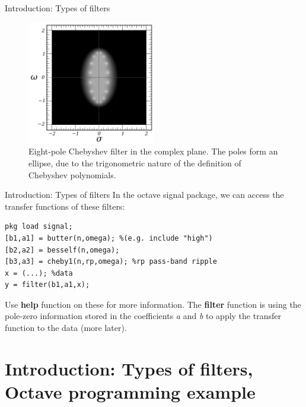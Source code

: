 \documentclass{beamer}
\begin{document}
\begin{frame}{Introduction: Types of filters}
\begin{figure}
\centering
\includegraphics[width=0.5\textwidth]{figures/chebyshev.png}
\caption{\label{fig:filters5} Eight-pole Chebyshev filter in the complex plane. The poles form an ellipse, due to the trigonometric nature of the definition of Chebyshev polynomials.}
\end{figure}
\end{frame}

\begin{frame}[fragile]{Introduction: Types of filters}
\small
In the octave signal package, we can access the transfer functions of these filters:
\begin{verbatim}
pkg load signal;
[b1,a1] = butter(n,omega); %(e.g. include "high")
[b2,a2] = besself(n,omega);
[b3,a3] = cheby1(n,rp,omega); %rp pass-band ripple
x = (...); %data
y = filter(b1,a1,x);
\end{verbatim}
Use \textbf{help} function on these for more information.  The \textbf{filter} function is using the pole-zero information stored in the coefficients \textit{a} and \textit{b} to apply the transfer function to the data (more later).
\end{frame}

\section{Introduction: Types of filters, Octave programming example}
\end{document}
